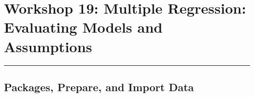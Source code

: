 \documentclass[
]{book}
\let\oldsection\section
\renewcommand{\section}{\needspace{5\baselineskip}\oldsection}
\begin{document}
\chapter{\texorpdfstring{\textbf{Workshop 19: Multiple Regression: Evaluating Models and Assumptions}}{Workshop 19: Multiple Regression: Evaluating Models and Assumptions}}\label{workshop-19-multiple-regression-evaluating-models-and-assumptions}

\begin{center}\rule{0.5\linewidth}{0.5pt}\end{center}

\section{\texorpdfstring{\textbf{Packages, Prepare, and Import Data}}{Packages, Prepare, and Import Data}}\label{packages-prepare-and-import-data-1}
\end{document}
